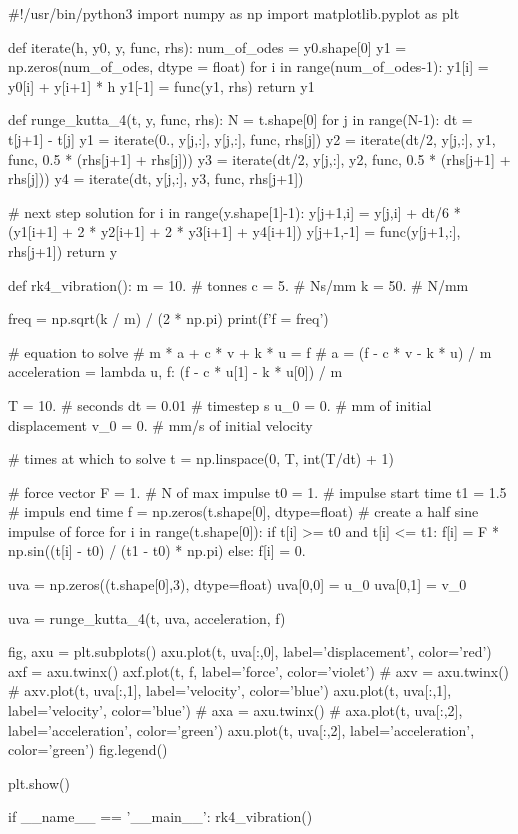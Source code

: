 \documentclass[10pt,b5paper,titlepage]{book}
\begin{document}
\begin{python}
#!/usr/bin/python3
import numpy as np
import matplotlib.pyplot as plt


def iterate(h, y0, y, func, rhs):
    num_of_odes = y0.shape[0]
    y1 = np.zeros(num_of_odes, dtype = float)
    for i in range(num_of_odes-1):
        y1[i] = y0[i] + y[i+1] * h
    y1[-1] = func(y1, rhs)
    return y1


def runge_kutta_4(t, y, func, rhs):
    N = t.shape[0]
    for j in range(N-1):
        dt = t[j+1] - t[j]
        y1 = iterate(0., y[j,:], y[j,:], func, rhs[j])
        y2 = iterate(dt/2, y[j,:], y1, func, 0.5 * (rhs[j+1] + rhs[j]))
        y3 = iterate(dt/2, y[j,:], y2, func, 0.5 * (rhs[j+1] + rhs[j]))
        y4 = iterate(dt, y[j,:], y3, func, rhs[j+1])

        # next step solution
        for i in range(y.shape[1]-1):
            y[j+1,i] = y[j,i] + dt/6 * (y1[i+1] + 2 * y2[i+1] + 2 * y3[i+1] + y4[i+1])
        y[j+1,-1] = func(y[j+1,:], rhs[j+1])
    return y


def rk4_vibration():
    m = 10.   # tonnes
    c = 5.    # Ns/mm
    k = 50.   # N/mm

    freq = np.sqrt(k / m) / (2 * np.pi)
    print(f'f = {freq}')

    # equation to solve
    # m * a + c * v + k * u = f
    # a = (f - c * v - k * u) / m
    acceleration = lambda u, f: (f - c * u[1] - k * u[0]) / m

    T = 10.     # seconds
    dt = 0.01   # timestep s
    u_0 = 0.    # mm of initial displacement
    v_0 = 0.    # mm/s of initial velocity

    # times at which to solve
    t = np.linspace(0, T, int(T/dt) + 1)

    # force vector
    F = 1.    # N of max impulse
    t0 = 1.   # impulse start time
    t1 = 1.5  # impuls end time
    f = np.zeros(t.shape[0], dtype=float)
    # create a half sine impulse of force
    for i in range(t.shape[0]):
        if t[i] >= t0 and t[i] <= t1:
            f[i] = F * np.sin((t[i] - t0) / (t1 - t0) * np.pi)
        else:
            f[i] = 0.

    uva = np.zeros((t.shape[0],3), dtype=float)
    uva[0,0] = u_0
    uva[0,1] = v_0

    uva = runge_kutta_4(t, uva, acceleration, f)

    fig, axu = plt.subplots()
    axu.plot(t, uva[:,0], label='displacement', color='red')
    axf = axu.twinx()
    axf.plot(t, f, label='force', color='violet')
    # axv = axu.twinx()
    # axv.plot(t, uva[:,1], label='velocity', color='blue')
    axu.plot(t, uva[:,1], label='velocity', color='blue')
    # axa = axu.twinx()
    # axa.plot(t, uva[:,2], label='acceleration', color='green')
    axu.plot(t, uva[:,2], label='acceleration', color='green')
    fig.legend()

    plt.show()

if __name__ == '__main__':
    rk4_vibration()

\end{python}
\end{document}
